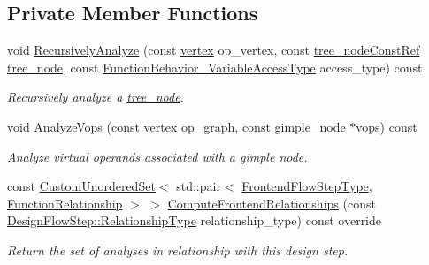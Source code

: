\subsection*{Private Member Functions}
\begin{DoxyCompactItemize}
\item 
void \hyperlink{classVarComputation_adbf3ccb08fa07a97200ab564774c9518}{Recursively\+Analyze} (const \hyperlink{graph_8hpp_abefdcf0544e601805af44eca032cca14}{vertex} op\+\_\+vertex, const \hyperlink{tree__node_8hpp_a3cf5d02292c940f3892425a5b5fdec3c}{tree\+\_\+node\+Const\+Ref} \hyperlink{classtree__node}{tree\+\_\+node}, const \hyperlink{function__behavior_8hpp_a68c28bfcfefbe63cece191e941af0409}{Function\+Behavior\+\_\+\+Variable\+Access\+Type} access\+\_\+type) const
\begin{DoxyCompactList}\small\item\em Recursively analyze a \hyperlink{classtree__node}{tree\+\_\+node}. \end{DoxyCompactList}\item 
void \hyperlink{classVarComputation_ad1023a1abf7c16ada56d21c0385a54be}{Analyze\+Vops} (const \hyperlink{graph_8hpp_abefdcf0544e601805af44eca032cca14}{vertex} op\+\_\+graph, const \hyperlink{structgimple__node}{gimple\+\_\+node} $\ast$vops) const
\begin{DoxyCompactList}\small\item\em Analyze virtual operands associated with a gimple node. \end{DoxyCompactList}\item 
const \hyperlink{classCustomUnorderedSet}{Custom\+Unordered\+Set}$<$ std\+::pair$<$ \hyperlink{frontend__flow__step_8hpp_afeb3716c693d2b2e4ed3e6d04c3b63bb}{Frontend\+Flow\+Step\+Type}, \hyperlink{classFrontendFlowStep_af7cf30f2023e5b99e637dc2058289ab0}{Function\+Relationship} $>$ $>$ \hyperlink{classVarComputation_abbb72405583e939427e62d78175ac7e3}{Compute\+Frontend\+Relationships} (const \hyperlink{classDesignFlowStep_a723a3baf19ff2ceb77bc13e099d0b1b7}{Design\+Flow\+Step\+::\+Relationship\+Type} relationship\+\_\+type) const override
\begin{DoxyCompactList}\small\item\em Return the set of analyses in relationship with this design step. \end{DoxyCompactList}\end{DoxyCompactItemize}
